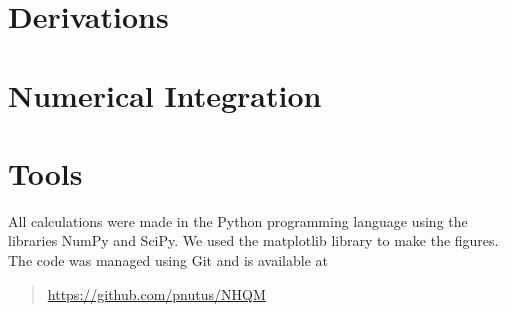 \documentclass[12pt,a4paper]{report}
\begin{document}






\appendix

\chapter{Derivations}







\chapter{Numerical Integration}



\chapter{Tools}

All calculations were made in the Python programming language 
using the libraries NumPy and SciPy. We used the matplotlib 
library to make the figures. The code was managed using Git 
and is available at
\begin{quote}
  \url{https://github.com/pnutus/NHQM}
\end{quote}


{}
\end{document}
